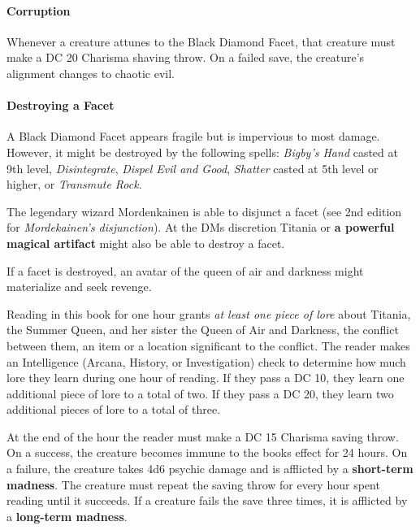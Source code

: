 \documentclass[letter,10pt,twocolumn,openany]{dndbook}
\begin{document}
\paragraph{Corruption}
Whenever a creature attunes to the Black Diamond Facet, that creature must make a DC 20 Charisma shaving throw.
On a failed save, the creature's alignment changes to chaotic evil.

\paragraph{Destroying a Facet}
A Black Diamond Facet appears fragile but is impervious to most damage.
However, it might be destroyed by the following spells:
\textit{Bigby's Hand} casted at 9th level,
\textit{Disintegrate},
\textit{Dispel Evil and Good},
\textit{Shatter} casted at 5th level or higher,
or \textit{Transmute Rock}.

The legendary wizard Mordenkainen is able to disjunct a facet (see 2nd edition for \textit{Mordekainen's disjunction}).
At the DMs discretion Titania or \textbf{a powerful magical artifact} might also be able to destroy a facet.

If a facet is destroyed, an avatar of the queen of air and darkness might materialize and seek revenge.



Reading in this book for one hour grants \textit{at least one piece of lore} about Titania, the Summer Queen, and her sister the Queen of Air and Darkness, the conflict between them, an item or a location significant to the conflict.
The reader makes an Intelligence (Arcana, History, or Investigation) check to determine how much lore they learn during one hour of reading.
If they pass a DC 10, they learn one additional piece of lore to a total of two.
If they pass a DC 20, they learn two additional pieces of lore to a total of three.


At the end of the hour the reader must make a DC 15 Charisma saving throw.
On a success, the creature becomes immune to the books effect for 24 hours.
On a failure, the creature takes 4d6 psychic damage and is afflicted by a \textbf{short-term madness}.
The creature must repeat the saving throw for every hour spent reading until it succeeds.
If a creature fails the save three times, it is afflicted by a \textbf{long-term madness}.
\end{document}
